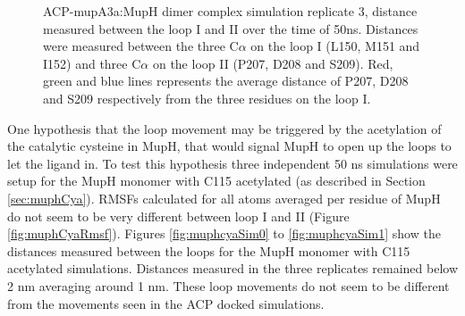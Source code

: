 		\setlength\fboxsep{5pt}
		\setlength\fboxrule{1.5pt}
		\begin{figure}[htbp]
		\centering
		\caption[ACP-mupA3a:MupH dimer complex simulation replicate 3, distance measured between the loop I and II over the time of 50ns.]{ACP-mupA3a:MupH dimer complex simulation replicate 3, distance measured between the loop I and II over the time of 50ns. Distances were measured between the three C$ \alpha $ on the loop I (L150, M151 and I152) and three C$ \alpha $ on the loop II (P207, D208 and S209). Red, green and blue lines represents the average distance of P207, D208 and S209 respectively from the three residues on the loop I.}
		\label{fig:AcpSpmMuphCyaDimerSim2}
		\end{figure}
\newpage
	One hypothesis that the loop movement may be triggered by the acetylation of the catalytic cysteine in MupH, that would signal MupH to open up the loops to let the ligand in. To test this hypothesis three independent 50 ns simulations were setup for the MupH monomer with C115 acetylated (as described in Section \ref{sec:muphCya}). RMSFs calculated for all atoms averaged per residue of MupH do not seem to be very different between loop I and II (Figure \ref{fig:muphCyaRmsf}). Figures \ref{fig:muphcyaSim0} to \ref{fig:muphcyaSim1} show the distances measured between the loops for the MupH monomer with C115 acetylated simulations. Distances measured in the three replicates remained below 2 nm averaging around 1 nm. These loop movements do not seem to be different from the movements seen in the ACP docked simulations. 

